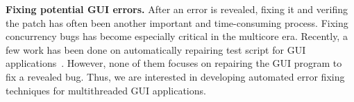 \textbf{Fixing potential GUI errors.} After an error is revealed, fixing
it and verifing the patch has often been another important and time-consuming process. Fixing concurrency
bugs has become especially critical in the multicore era.
Recently, a few work has been done
on automatically repairing test script for GUI applications~\cite{Daniel:2011:AGR:2002931.2002937, Huang:2010:RGT:1828417.1828465}. However, none of them focuses on repairing
the GUI program to fix a revealed bug. Thus, we are interested in 
developing automated error fixing techniques for
multithreaded GUI applications.

